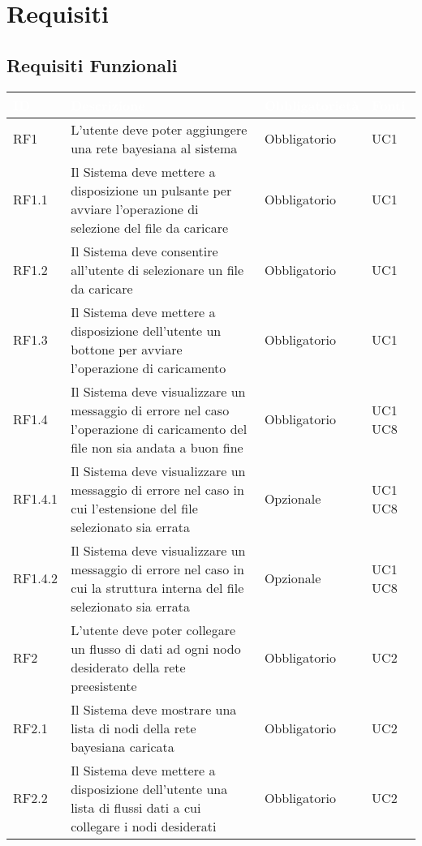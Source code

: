 \section{Requisiti}\label{Requisiti}

\subsection{Requisiti Funzionali}\label{RF}
\begin{center}
\begin{longtable}[c]{|m{}|m{}|m{}|m{}|}
\hline
\rowcolor{bluelogo}\textbf{\textcolor{white}{ID}} & \textbf{\textcolor{white}{Descrizione}} & \textbf{\textcolor{white}{Obbligatorietà}} & \textbf{\textcolor{white}{Fonti}}\\
\hline \hline
\endhead
RF1 & L'utente deve poter aggiungere una rete bayesiana al sistema & Obbligatorio & UC1\\
\hline
\rowcolor{grigio}RF1.1 & Il Sistema deve mettere a disposizione un pulsante per avviare l'operazione di selezione del file da caricare & Obbligatorio & UC1\\
\hline
RF1.2 & Il Sistema deve consentire all'utente di selezionare un file da caricare & Obbligatorio & UC1\\
\hline
\rowcolor{grigio}RF1.3 & Il Sistema deve mettere a disposizione dell'utente un bottone per avviare l'operazione di caricamento & Obbligatorio & UC1\\
\hline
RF1.4 & Il Sistema deve visualizzare un messaggio di errore nel caso l'operazione di caricamento del file non sia andata a buon fine & Obbligatorio & UC1 UC8\\
\hline
\rowcolor{grigio}RF1.4.1 & Il Sistema deve visualizzare un messaggio di errore nel caso in cui l'estensione del file selezionato sia errata & Opzionale & UC1 UC8\\
\hline
RF1.4.2 & Il Sistema deve visualizzare un messaggio di errore nel caso in cui la struttura interna del file selezionato sia errata & Opzionale & UC1 UC8\\
\hline
\rowcolor{grigio}RF2 & L'utente deve poter collegare un flusso di dati ad ogni nodo desiderato della rete preesistente & Obbligatorio & UC2\\
\hline
RF2.1 & Il Sistema deve mostrare una lista di nodi della rete bayesiana caricata & Obbligatorio & UC2\\
\hline
\rowcolor{grigio}RF2.2 & Il Sistema deve mettere a disposizione dell'utente una lista di flussi dati a cui collegare i nodi desiderati & Obbligatorio & UC2\\

\end{longtable}
\end{center}
